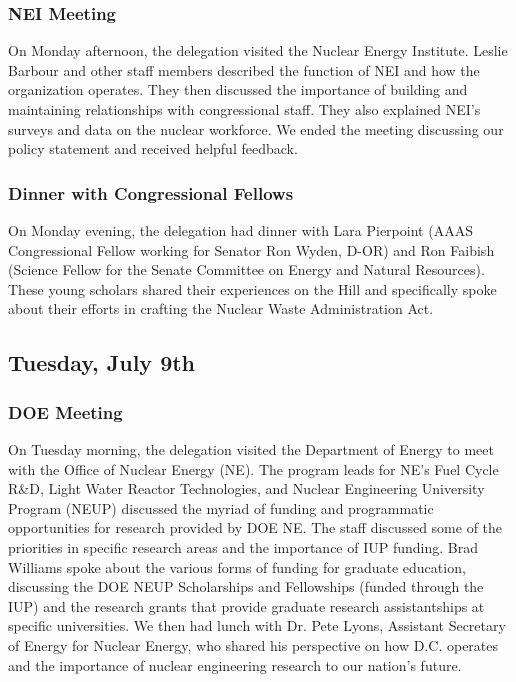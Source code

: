 \subsubsection*{NEI Meeting} 

On Monday afternoon, the delegation visited the Nuclear Energy Institute. Leslie
Barbour and other staff members described the function of NEI and how the
organization operates. They then discussed the importance of building and
maintaining relationships with congressional staff. They also explained NEI's
surveys and data on the nuclear workforce. We ended the meeting discussing our
policy statement and received helpful feedback.

\subsubsection*{Dinner with Congressional Fellows}

On Monday evening, the delegation had dinner with Lara Pierpoint (AAAS
Congressional Fellow working for Senator Ron Wyden, D-OR) and Ron Faibish
(Science Fellow for the Senate Committee on Energy and Natural Resources). These
young scholars shared their experiences on the Hill and specifically spoke about
their efforts in crafting the Nuclear Waste Administration Act.

\subsection*{Tuesday, July 9th}

\subsubsection*{DOE Meeting}

On Tuesday morning, the delegation visited the Department of Energy to meet with
the Office of Nuclear Energy (NE). The program leads for NE's Fuel Cycle R\&D,
Light Water Reactor Technologies, and Nuclear Engineering University Program
(NEUP) discussed the myriad of funding and programmatic opportunities for
research provided by DOE NE. The staff discussed some of the priorities in
specific research areas and the importance of IUP funding. Brad Williams spoke
about the various forms of funding for graduate education, discussing the DOE
NEUP Scholarships and Fellowships (funded through the IUP) and the research
grants that provide graduate research assistantships at specific
universities. We then had lunch with Dr. Pete Lyons, Assistant Secretary of
Energy for Nuclear Energy, who shared his perspective on how D.C. operates and
the importance of nuclear engineering research to our nation's future.

